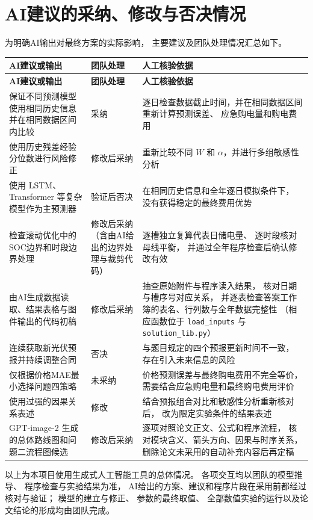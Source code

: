 \documentclass[UTF8,a4paper,11pt]{ctexart}
\begin{document}
\section{AI建议的采纳、修改与否决情况}

为明确AI输出对最终方案的实际影响，
主要建议及团队处理情况汇总如下。

\begin{longtable}{
    L{0.31\textwidth}
    C{0.15\textwidth}
    L{0.43\textwidth}
}
\toprule
\textbf{AI建议或输出} &
\textbf{团队处理} &
\textbf{人工核验依据} \\
\midrule
\endfirsthead
\toprule
\textbf{AI建议或输出} &
\textbf{团队处理} &
\textbf{人工核验依据} \\
\midrule
\endhead

保证不同预测模型使用相同历史信息并在相同数据区间内比较 &
采纳 &
逐日检查数据截止时间，并在相同数据区间重新计算预测误差、
应急购电量和购电费用 \\
使用历史残差经验分位数进行风险修正 &
修改后采纳 &
重新比较不同 $W$ 和 $\alpha$，并进行多组敏感性分析 \\
使用 LSTM、Transformer 等复杂模型作为主预测器 &
验证后否决 &
在相同历史信息和全年逐日模拟条件下，
没有获得稳定的最终费用优势 \\
检查滚动优化中的SOC边界和时段边界处理 &
修改后采纳（含由AI给出的边界处理与裁剪代码） &
逐槽独立复算代表日储电量、
逐时段核对母线平衡，
并通过全年程序检查后确认修改有效 \\
由AI生成数据读取、结果表格与图件输出的代码初稿 &
修改后采纳 &
抽查原始附件与程序读入结果，
核对日期与槽序号对应关系，
并逐表检查答案工作簿的表名、行列数与全年数据完整性
（相应函数位于 \texttt{load\_inputs} 与 \texttt{solution\_lib.py}） \\
连续获取新光伏预报并持续调整合同 &
否决 &
与题目规定的四个预报更新时间不一致，
存在引入未来信息的风险 \\
仅根据价格MAE最小选择问题四策略 &
未采纳 &
价格预测误差与最终购电费用不完全等价，
需要结合应急购电量和最终购电费用评价 \\
使用过强的因果关系表述 &
修改 &
结合预报组合对比和敏感性分析重新核对后，
改为限定实验条件的结果表述 \\
GPT-image-2 生成的总体路线图和问题二流程图候选 &
修改后采纳 &
逐项对照论文正文、公式和程序流程，
核对模块含义、箭头方向、因果与时序关系，
删除论文未采用的自动补充内容后再定稿 \\
\bottomrule
\end{longtable}

\vspace{0.6em}

以上为本项目使用生成式人工智能工具的总体情况。
各项交互均以团队的模型推导、
程序检查与实验结果为准，
AI给出的方案、建议和程序片段在采用前都经过核对与验证；
模型的建立与修正、
参数的最终取值、
全部数值实验的运行以及论文结论的形成均由团队完成。
\end{document}
